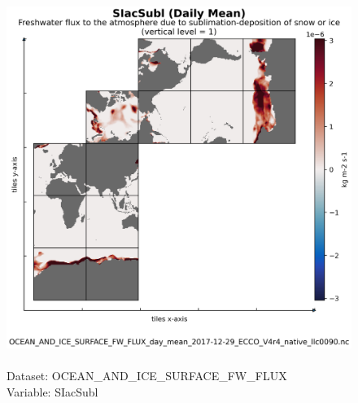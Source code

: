 \begin{figure}[H]
\centering
\includegraphics[scale=0.5]{../images/plots/native_plots/Ocean_and_Sea-Ice_Surface_Freshwater_Fluxes/SIacSubl.png}
\caption{\\Dataset: OCEAN\_AND\_ICE\_SURFACE\_FW\_FLUX\\Variable: SIacSubl}
\label{tab:table-OCEAN_AND_ICE_SURFACE_FW_FLUX_SIacSubl-Plot}
\end{figure}
\pagebreak
